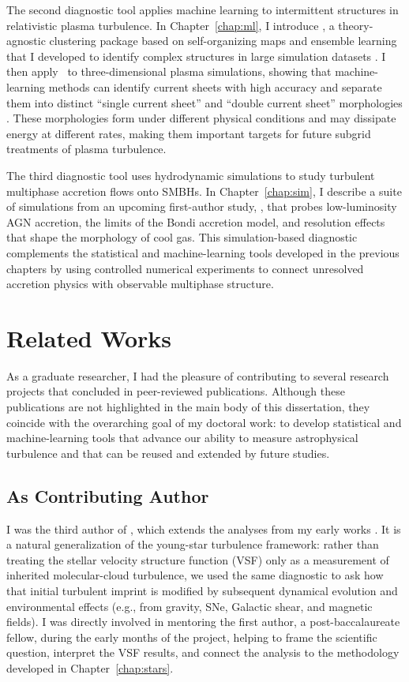 The second diagnostic tool applies machine learning to intermittent structures in relativistic plasma turbulence.
In Chapter~\ref{chap:ml}, I introduce \awesom, a theory-agnostic clustering package based on self-organizing maps and ensemble learning that I developed to identify complex structures in large simulation datasets \citep{ha_awesom_2025}.
I then apply \awesom\ to three-dimensional plasma simulations, showing that machine-learning methods can identify current sheets with high accuracy and separate them into distinct ``single current sheet'' and ``double current sheet'' morphologies \citep{ha_machine_2025}.
These morphologies form under different physical conditions and may dissipate energy at different rates, making them important targets for future subgrid treatments of plasma turbulence.

The third diagnostic tool uses hydrodynamic simulations to study turbulent multiphase accretion flows onto SMBHs.
In Chapter~\ref{chap:sim}, I describe a suite of simulations from an upcoming first-author study, \citet{ha_galaxy-_2026}, that probes low-luminosity AGN accretion, the limits of the Bondi accretion model, and resolution effects that shape the morphology of cool gas.
This simulation-based diagnostic complements the statistical and machine-learning tools developed in the previous chapters by using controlled numerical experiments to connect unresolved accretion physics with observable multiphase structure.

\section{Related Works}

As a graduate researcher, I had the pleasure of contributing to several research projects that concluded in peer-reviewed publications. 
Although these publications are not highlighted in the main body of this dissertation, they coincide with the overarching goal of my doctoral work: to develop statistical and machine-learning tools that advance our ability to measure astrophysical turbulence and that can be reused and extended by future studies. 

\subsection{As Contributing Author}

I was the third author of \citet{velguth_probing_2025}, which extends the analyses from my early works \citep{ha_measuring_2021, ha_turbulence_2022}.
It is a natural generalization of the young-star turbulence framework: rather than treating the stellar velocity structure function (VSF) only as a measurement of inherited molecular-cloud turbulence, we used the same diagnostic to ask how that initial turbulent imprint is modified by subsequent dynamical evolution and environmental effects (e.g., from gravity, SNe, Galactic shear, and magnetic fields). 
I was directly involved in mentoring the first author, a post-baccalaureate fellow, during the early months of the project, helping to frame the scientific question, interpret the VSF results, and connect the analysis to the methodology developed in Chapter~\ref{chap:stars}.

